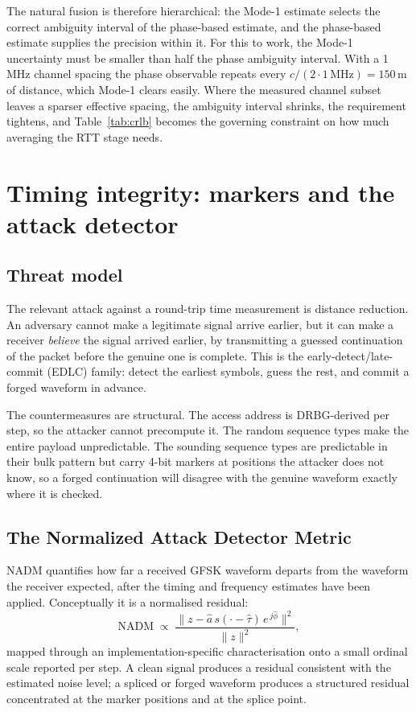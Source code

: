 \documentclass[11pt,a4paper]{article}
\newcommand{\NADM}{\mathrm{NADM}}
\begin{document}
The natural fusion is therefore hierarchical: the Mode-1 estimate selects the correct ambiguity
interval of the phase-based estimate, and the phase-based estimate supplies the precision within it.
For this to work, the Mode-1 uncertainty must be smaller than half the phase ambiguity interval.
With a 1\,MHz channel spacing the phase observable repeats every $c/(2\cdot 1\,\text{MHz}) = 150$\,m
of distance, which Mode-1 clears easily. Where the measured channel subset leaves a sparser effective
spacing, the ambiguity interval shrinks, the requirement tightens, and Table~\ref{tab:crlb} becomes
the governing constraint on how much averaging the RTT stage needs.

\section{Timing integrity: markers and the attack detector}

\subsection{Threat model}

The relevant attack against a round-trip time measurement is distance reduction. An adversary
cannot make a legitimate signal arrive earlier, but it can make a receiver \emph{believe} the signal
arrived earlier, by transmitting a guessed continuation of the packet before the genuine one is
complete. This is the early-detect/late-commit (EDLC) family: detect the earliest symbols, guess the
rest, and commit a forged waveform in advance.

The countermeasures are structural. The access address is DRBG-derived per step, so the attacker
cannot precompute it. The random sequence types make the entire payload unpredictable. The sounding
sequence types are predictable in their bulk pattern but carry 4-bit markers at positions the
attacker does not know, so a forged continuation will disagree with the genuine waveform exactly
where it is checked.

\subsection{The Normalized Attack Detector Metric}

$\NADM$ quantifies how far a received GFSK waveform departs from the waveform the receiver expected,
after the timing and frequency estimates have been applied. Conceptually it is a normalised residual:
\begin{equation}
\NADM \;\propto\; \frac{\bigl\| z - \hat a\, s(\cdot - \hat\tau)\,e^{\,j\hat\phi} \bigr\|^2}
                        {\bigl\| z \bigr\|^2},
\label{eq:nadm}
\end{equation}
mapped through an implementation-specific characterisation onto a small ordinal scale reported per
step. A clean signal produces a residual consistent with the estimated noise level; a spliced or
forged waveform produces a structured residual concentrated at the marker positions and at the
splice point.
\end{document}
